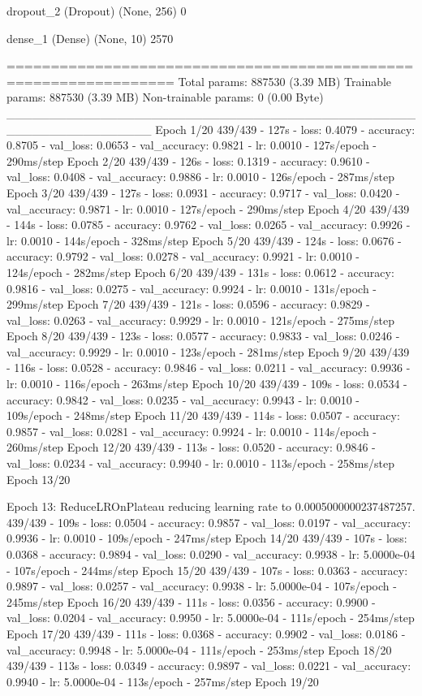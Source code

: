 \documentclass[11pt, a4paper]{article} %
\begin{document}
 dropout_2 (Dropout)         (None, 256)               0

 dense_1 (Dense)             (None, 10)                2570

=================================================================
Total params: 887530 (3.39 MB)
Trainable params: 887530 (3.39 MB)
Non-trainable params: 0 (0.00 Byte)
_________________________________________________________________
Epoch 1/20
439/439 - 127s - loss: 0.4079 - accuracy: 0.8705 - val_loss: 0.0653 - val_accuracy: 0.9821 - lr: 0.0010 - 127s/epoch - 290ms/step
Epoch 2/20
439/439 - 126s - loss: 0.1319 - accuracy: 0.9610 - val_loss: 0.0408 - val_accuracy: 0.9886 - lr: 0.0010 - 126s/epoch - 287ms/step
Epoch 3/20
439/439 - 127s - loss: 0.0931 - accuracy: 0.9717 - val_loss: 0.0420 - val_accuracy: 0.9871 - lr: 0.0010 - 127s/epoch - 290ms/step
Epoch 4/20
439/439 - 144s - loss: 0.0785 - accuracy: 0.9762 - val_loss: 0.0265 - val_accuracy: 0.9926 - lr: 0.0010 - 144s/epoch - 328ms/step
Epoch 5/20
439/439 - 124s - loss: 0.0676 - accuracy: 0.9792 - val_loss: 0.0278 - val_accuracy: 0.9921 - lr: 0.0010 - 124s/epoch - 282ms/step
Epoch 6/20
439/439 - 131s - loss: 0.0612 - accuracy: 0.9816 - val_loss: 0.0275 - val_accuracy: 0.9924 - lr: 0.0010 - 131s/epoch - 299ms/step
Epoch 7/20
439/439 - 121s - loss: 0.0596 - accuracy: 0.9829 - val_loss: 0.0263 - val_accuracy: 0.9929 - lr: 0.0010 - 121s/epoch - 275ms/step
Epoch 8/20
439/439 - 123s - loss: 0.0577 - accuracy: 0.9833 - val_loss: 0.0246 - val_accuracy: 0.9929 - lr: 0.0010 - 123s/epoch - 281ms/step
Epoch 9/20
439/439 - 116s - loss: 0.0528 - accuracy: 0.9846 - val_loss: 0.0211 - val_accuracy: 0.9936 - lr: 0.0010 - 116s/epoch - 263ms/step
Epoch 10/20
439/439 - 109s - loss: 0.0534 - accuracy: 0.9842 - val_loss: 0.0235 - val_accuracy: 0.9943 - lr: 0.0010 - 109s/epoch - 248ms/step
Epoch 11/20
439/439 - 114s - loss: 0.0507 - accuracy: 0.9857 - val_loss: 0.0281 - val_accuracy: 0.9924 - lr: 0.0010 - 114s/epoch - 260ms/step
Epoch 12/20
439/439 - 113s - loss: 0.0520 - accuracy: 0.9846 - val_loss: 0.0234 - val_accuracy: 0.9940 - lr: 0.0010 - 113s/epoch - 258ms/step
Epoch 13/20

Epoch 13: ReduceLROnPlateau reducing learning rate to 0.0005000000237487257.
439/439 - 109s - loss: 0.0504 - accuracy: 0.9857 - val_loss: 0.0197 - val_accuracy: 0.9936 - lr: 0.0010 - 109s/epoch - 247ms/step
Epoch 14/20
439/439 - 107s - loss: 0.0368 - accuracy: 0.9894 - val_loss: 0.0290 - val_accuracy: 0.9938 - lr: 5.0000e-04 - 107s/epoch - 244ms/step
Epoch 15/20
439/439 - 107s - loss: 0.0363 - accuracy: 0.9897 - val_loss: 0.0257 - val_accuracy: 0.9938 - lr: 5.0000e-04 - 107s/epoch - 245ms/step
Epoch 16/20
439/439 - 111s - loss: 0.0356 - accuracy: 0.9900 - val_loss: 0.0204 - val_accuracy: 0.9950 - lr: 5.0000e-04 - 111s/epoch - 254ms/step
Epoch 17/20
439/439 - 111s - loss: 0.0368 - accuracy: 0.9902 - val_loss: 0.0186 - val_accuracy: 0.9948 - lr: 5.0000e-04 - 111s/epoch - 253ms/step
Epoch 18/20
439/439 - 113s - loss: 0.0349 - accuracy: 0.9897 - val_loss: 0.0221 - val_accuracy: 0.9940 - lr: 5.0000e-04 - 113s/epoch - 257ms/step
Epoch 19/20
\end{document}
